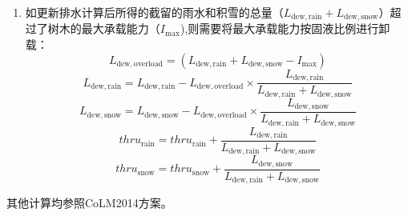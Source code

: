\begin{enumerate}
  \item 如更新排水计算后所得的截留的雨水和积雪的总量（$L_{\mathrm{dew,rain}}+L_{\mathrm{dew,snow}}$）超过了树木的最大承载能力（$I_{\mathrm{max}}$),则需要将最大承载能力按固液比例进行卸载：
  \begin{equation}
    L_{\mathrm{dew,overload}}=(L_{\mathrm{dew,rain}}+L_{\mathrm{dew,snow}}-I_{\mathrm{max}})
  \end{equation}
  \begin{equation}
    L_{\mathrm{dew,rain}}=L_{\mathrm{dew,rain}} - L_{\mathrm{dew,overload}} \times \frac{L_{\mathrm{dew,rain}}}{L_{\mathrm{dew,rain}}+L_{\mathrm{dew,snow}}}
  \end{equation}
  \begin{equation}
    L_{\mathrm{dew,snow}}=L_{\mathrm{dew,snow}} - L_{\mathrm{dew,overload}} \times   \frac{L_{\mathrm{dew,snow}}}{L_{\mathrm{dew,rain}}+L_{\mathrm{dew,snow}}}
  \end{equation}
  \begin{equation}
    thru_{\mathrm{rain}}=thru_{\mathrm{rain}} + \frac{L_{\mathrm{dew,rain}}}{L_{\mathrm{dew,rain}}+L_{\mathrm{dew,snow}}}
  \end{equation}
  \begin{equation}
    thru_{\mathrm{snow}}=thru_{\mathrm{snow}} + \frac{L_{\mathrm{dew,snow}}}{L_{\mathrm{dew,rain}}+L_{\mathrm{dew,snow}}}
  \end{equation}
\end{enumerate}
其他计算均参照CoLM2014方案。


